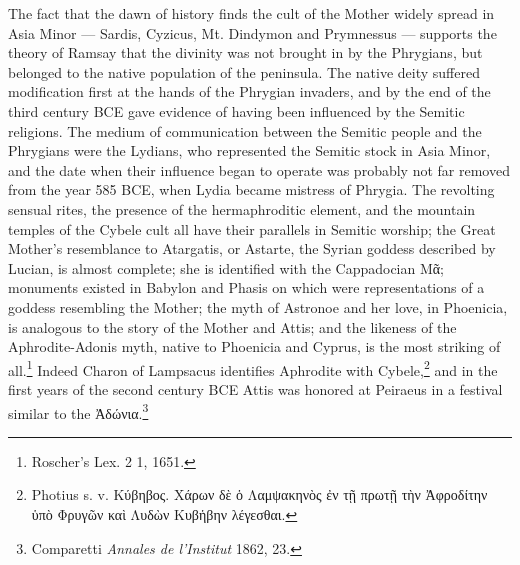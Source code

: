 \documentclass[a4paper, 11pt, oneside, polutonikogreek, english]{article}
\begin{document}
The fact that the dawn of history finds the cult of the Mother widely spread in Asia Minor --- Sardis, Cyzicus, Mt. Dindymon and Prymnessus --- supports the theory of Ramsay that the divinity was not brought in by the Phrygians, but belonged to the native population of the peninsula. The native deity suffered modification first at the hands of the Phrygian invaders, and by the end of the third century \textsc{BCE} gave evidence of having been influenced by the Semitic religions. The medium of communication between the Semitic people and the Phrygians were the Lydians, who represented the Semitic stock in Asia Minor, and the date when their influence began to operate was probably not far removed from the year 585 \textsc{BCE}, when Lydia became mistress of Phrygia. The revolting sensual rites, the presence of the hermaphroditic element, and the mountain temples of the Cybele cult all have their parallels in Semitic worship; the Great Mother's resemblance to Atargatis, or Astarte, the Syrian goddess described by Lucian, is almost complete; she is identified with the Cappadocian Μᾶ; monuments existed in Babylon and Phasis on which were representations of a goddess resembling the Mother; the myth of Astronoe and her love, in Phoenicia, is analogous to the story of the Mother and Attis; and the likeness of the Aphrodite-Adonis myth, native to Phoenicia and Cyprus, is the most striking of all.\footnote{Roscher's Lex. 2 1, 1651.} Indeed Charon of Lampsacus identifies Aphrodite with Cybele,\footnote{Photius s. v. Κύβηβος. Χάρων δὲ ὁ Λαμψακηνὸς ἐν τῇ πρωτῇ τὴν Ἀφροδίτην ὑπὸ Φρυγῶν καὶ Λυδὼν Κυβἡβην λέγεσθαι.} and in the first years of the second century \textsc{BCE} Attis was honored at Peiraeus in a festival similar to the Ἀδώνια.\footnote{Comparetti \emph{Annales de l'Institut} 1862, 23.}
 
\end{document}
